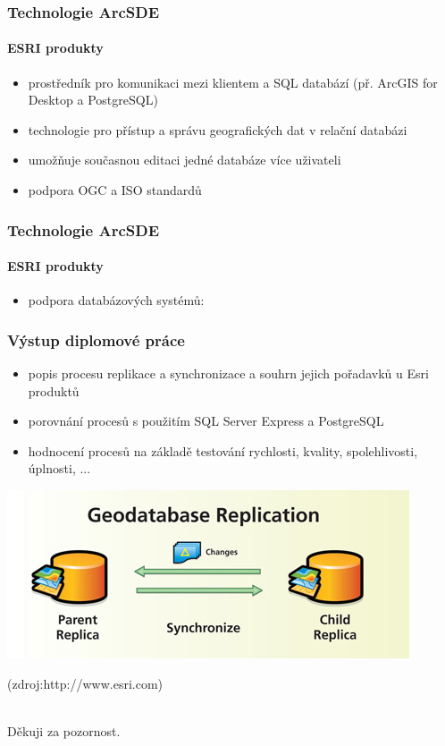 \documentclass[xcolor=dvipsnames, 14pt]{beamer}
\begin{document}
  \begin{frame}
    \frametitle{Technologie ArcSDE}
    \framesubtitle{ESRI produkty}
    \begin{itemize}
        \item prostředník pro komunikaci mezi klientem a SQL databází (př. ArcGIS for Desktop a PostgreSQL)
        \item technologie pro přístup a správu geografických dat v relační databázi
        \item umožňuje současnou editaci jedné databáze více uživateli
        \item podpora OGC a ISO standardů
    \end{itemize} 
  \end{frame}

  \begin{frame}
    \frametitle{Technologie ArcSDE}
    \framesubtitle{ESRI produkty}
    \begin{itemize}
        \item podpora databázových systémů:
          \begin{itemize}
          \end{itemize}
    \end{itemize} 
  \end{frame}

  \begin{frame}
    \frametitle{Výstup diplomové práce}
    \begin{itemize}
      \item popis procesu replikace a synchronizace a souhrn jejich pořadavků u Esri produktů
      \item porovnání procesů s použitím SQL Server Express a PostgreSQL
      \item hodnocení procesů na základě testování rychlosti, kvality, spolehlivosti, úplnosti, ...
    \end{itemize}
  \end{frame}
  
  \begin{frame}
    \begin{center}
      \includegraphics[scale=0.5]{obr/replication.jpg} 
      \\  \begin{tiny}(zdroj:http://www.esri.com)\end{tiny}
    \\ \huge{Děkuji za pozornost.}
    \end{center}
  \end{frame}
\end{document}
